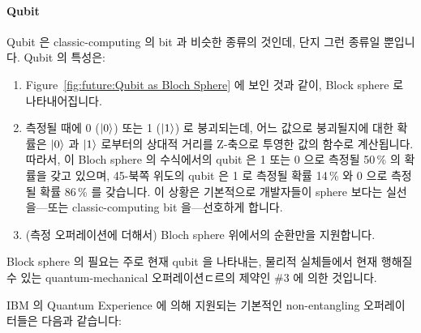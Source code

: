 \paragraph{Qubit}

Qubit 은 classic-computing 의 bit 과 비슷한 종류의 것인데, 단지 그런 종류일
뿐입니다.
Qubit 의 특성은:

\begin{enumerate}
\item	Figure~\ref{fig:future:Qubit as Bloch Sphere} 에 보인 것과 같이, Block
	sphere 로 나타내어집니다.
\item	측정될 때에 0 ($\ket{0}$) 또는 1 ($\ket{1}$) 로 붕괴되는데, 어느 값으로
	붕괴될지에 대한 확률은 $\ket{0}$ 과 $\ket{1}$ 로부터의 상대적 거리를
	Z-축으로 투영한 값의 함수로 계산됩니다.
	따라서, 이 Bloch sphere 의 수식에서의 qubit 은 1 또는 0 으로 측정될
	50\,\% 의 확률을 갖고 있으며, 45\textdegree-북쪽 위도의 qubit 은 1 로
	측정될 확률 14\,\% 와 0 으로 측정될 확률 86\,\% 를 갖습니다.
	이 상황은 기본적으로 개발자들이 sphere 보다는 실선을---또는
	classic-computing bit 을---선호하게 합니다.
\item	(측정 오퍼레이션에 더해서) Bloch sphere 위에서의 순환만을 지원합니다.

\end{enumerate}

Block sphere 의 필요는 주로 현재 qubit 을 나타내는, 물리적 실체들에서 현재
행해질 수 있는 quantum-mechanical 오퍼레이션ㄷ르의 제약인 \#3 에 의한 것입니다.

IBM 의 Quantum Experience 에 의해 지원되는 기본적인 non-entangling
오퍼레이터들은 다음과 같습니다:
\iffalse

